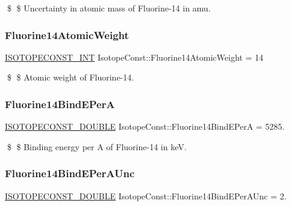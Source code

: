\$ \$ Uncertainty in atomic mass of Fluorine-\/14 in amu. \mbox{\label{group___isotope_const-_fluorine-_f14_ga29b05f9dc0452374e4aa6869b324c934}} 
\subsubsection{\texorpdfstring{Fluorine14\+Atomic\+Weight}{Fluorine14AtomicWeight}}
{\footnotesize\ttfamily \mbox{\hyperlink{group___isotope_const-_macros_ga5f18360b3e99483a35c32d789e62621c}{I\+S\+O\+T\+O\+P\+E\+C\+O\+N\+S\+T\+\_\+\+I\+NT}} Isotope\+Const\+::\+Fluorine14\+Atomic\+Weight = 14}

\$ \$ Atomic weight of Fluorine-\/14. \mbox{\label{group___isotope_const-_fluorine-_f14_ga85106ffdc830ad9b472d22a14be8dcf5}} 
\subsubsection{\texorpdfstring{Fluorine14\+Bind\+E\+PerA}{Fluorine14BindEPerA}}
{\footnotesize\ttfamily \mbox{\hyperlink{group___isotope_const-_macros_ga8f45a7272ce02c0b4c65c44636ed719a}{I\+S\+O\+T\+O\+P\+E\+C\+O\+N\+S\+T\+\_\+\+D\+O\+U\+B\+LE}} Isotope\+Const\+::\+Fluorine14\+Bind\+E\+PerA = 5285.}

\$ \$ Binding energy per A of Fluorine-\/14 in keV. \mbox{\label{group___isotope_const-_fluorine-_f14_ga1d09368987e6c9c4654663340511c3a3}} 
\subsubsection{\texorpdfstring{Fluorine14\+Bind\+E\+Per\+A\+Unc}{Fluorine14BindEPerAUnc}}
{\footnotesize\ttfamily \mbox{\hyperlink{group___isotope_const-_macros_ga8f45a7272ce02c0b4c65c44636ed719a}{I\+S\+O\+T\+O\+P\+E\+C\+O\+N\+S\+T\+\_\+\+D\+O\+U\+B\+LE}} Isotope\+Const\+::\+Fluorine14\+Bind\+E\+Per\+A\+Unc = 2.}

